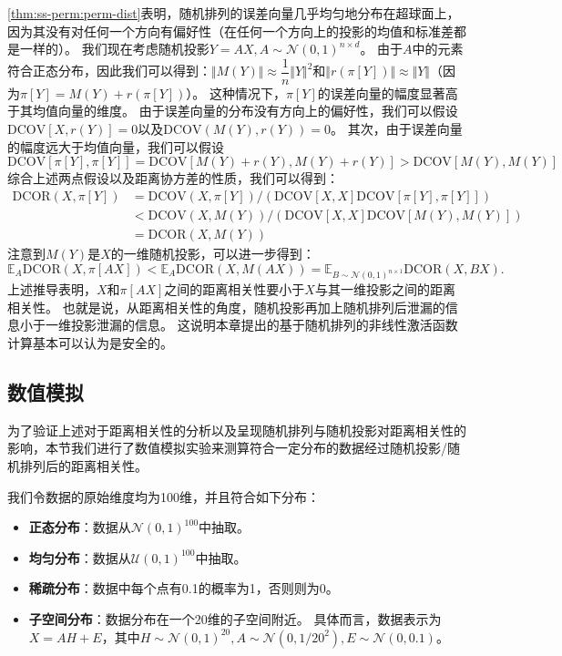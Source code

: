 \autoref{thm:ss-perm:perm-dist}表明，随机排列的误差向量几乎均匀地分布在超球面上，因为其没有对任何一个方向有偏好性（在任何一个方向上的投影的均值和标准差都是一样的）。
%
我们现在考虑随机投影$Y = AX, A \sim \mathcal N(0, 1)^{n\times d}$。
由于$A$中的元素符合正态分布，因此我们可以得到：$\Vert M(Y) \Vert \approx  \dfrac{1}{n} \Vert Y \Vert^2$和$\Vert r(\pi[Y]) \Vert \approx \Vert Y \Vert$（因为$\pi[Y] = M(Y) + r(\pi[Y])$）。
%
这种情况下，$\pi[Y]$的误差向量的幅度显著高于其均值向量的维度。
%
由于误差向量的分布没有方向上的偏好性，我们可以假设$\text{DCOV}[X, r(Y)] = 0$以及$\text{DCOV}(M(Y), r(Y)) = 0$。
%
其次，由于误差向量的幅度远大于均值向量，我们可以假设
\begin{equation}
\text{DCOV}[\pi[Y], \pi[Y]] = \text{DCOV}[M(Y) + r(Y), M(Y) + r(Y)] > \text{DCOV}[M(Y), M(Y)]
\end{equation}
%
综合上述两点假设以及距离协方差的性质，我们可以得到：
\begin{equation}
\begin{split}
    \text{DCOR}(X, \pi[Y]) &= \text{DCOV}(X, \pi[Y]) / (\text{DCOV}[X, X] \text{DCOV}[\pi[Y], \pi[Y]]) \\
    & < \text{DCOV}(X, M(Y)) / (\text{DCOV}[X, X] \text{DCOV}[M(Y), M(Y)]) \\
    & = \text{DCOR}(X, M(Y))
\end{split}
\end{equation}
注意到$M(Y)$是$X$的一维随机投影，可以进一步得到：
\begin{equation}
    \mathbb E_A \text{DCOR}(X, \pi[AX]) < \mathbb E_A \text{DCOR}(X, M(AX)) = \mathbb E_{B \sim \mathcal N(0, 1)^{n\times 1}} \text{DCOR}(X, BX).
\end{equation}
%
上述推导表明，$X$和$\pi[AX]$之间的距离相关性要小于$X$与其一维投影之间的距离相关性。
也就是说，从距离相关性的角度，随机投影再加上随机排列后泄漏的信息小于一维投影泄漏的信息。
%
这说明本章提出的基于随机排列的非线性激活函数计算基本可以认为是安全的。


\subsection{数值模拟}
为了验证上述对于距离相关性的分析以及呈现随机排列与随机投影对距离相关性的影响，本节我们进行了数值模拟实验来测算符合一定分布的数据经过随机投影/随机排列后的距离相关性。
%

我们令数据的原始维度均为100维，并且符合如下分布：
\begin{itemize}
    \item \textbf{正态分布}：数据从$\mathcal N(0, 1)^{100}$中抽取。
    \item \textbf{均匀分布}：数据从$\mathcal U(0, 1)^{100}$中抽取。
    \item \textbf{稀疏分布}：数据中每个点有0.1的概率为1，否则则为0。
    \item \textbf{子空间分布}：数据分布在一个20维的子空间附近。
    具体而言，数据表示为$X = AH + E$，其中$H \sim \mathcal N(0, 1)^{20}, A \sim \mathcal N(0, 1/{20^2}), E \sim \mathcal N(0, 0.1)$。
\end{itemize}


